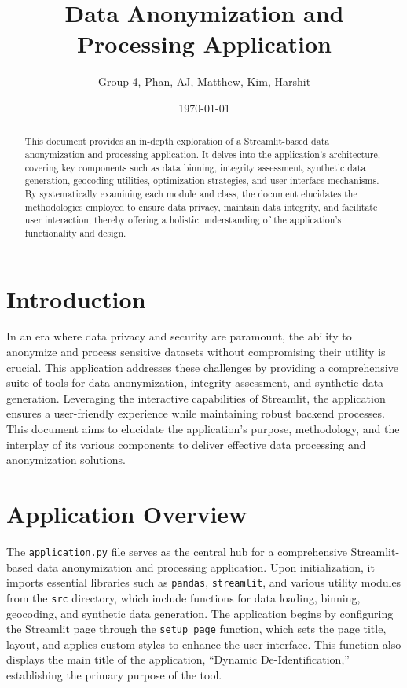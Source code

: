 \documentclass{article}
\title{Data Anonymization and Processing Application}
\author{Group 4, Phan, AJ, Matthew, Kim, Harshit}
\date{\today}
\begin{document}
\maketitle

\begin{abstract}
    This document provides an in-depth exploration of a Streamlit-based data anonymization and processing application. It delves into the application's architecture, covering key components such as data binning, integrity assessment, synthetic data generation, geocoding utilities, optimization strategies, and user interface mechanisms. By systematically examining each module and class, the document elucidates the methodologies employed to ensure data privacy, maintain data integrity, and facilitate user interaction, thereby offering a holistic understanding of the application's functionality and design.
\end{abstract}

\section*{Introduction}
In an era where data privacy and security are paramount, the ability to anonymize and process sensitive datasets without compromising their utility is crucial. This application addresses these challenges by providing a comprehensive suite of tools for data anonymization, integrity assessment, and synthetic data generation. Leveraging the interactive capabilities of Streamlit, the application ensures a user-friendly experience while maintaining robust backend processes. This document aims to elucidate the application's purpose, methodology, and the interplay of its various components to deliver effective data processing and anonymization solutions.

\section*{Application Overview}
The \texttt{application.py} file serves as the central hub for a comprehensive Streamlit-based data anonymization and processing application. Upon initialization, it imports essential libraries such as \texttt{pandas}, \texttt{streamlit}, and various utility modules from the \texttt{src} directory, which include functions for data loading, binning, geocoding, and synthetic data generation. The application begins by configuring the Streamlit page through the \texttt{setup\_page} function, which sets the page title, layout, and applies custom styles to enhance the user interface. This function also displays the main title of the application, ``Dynamic De-Identification,'' establishing the primary purpose of the tool.
\end{document}
